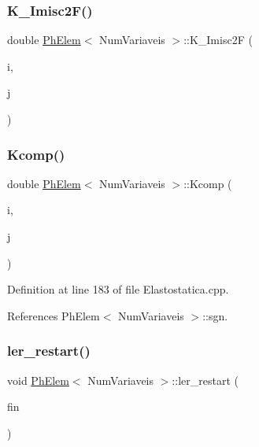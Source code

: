 \subsubsection{\texorpdfstring{K\+\_\+\+Imisc2\+F()}{K\_Imisc2F()}}
{\footnotesize\ttfamily double \hyperlink{classPhElem}{Ph\+Elem}$<$ Num\+Variaveis $>$\+::K\+\_\+\+Imisc2F (\begin{DoxyParamCaption}\item[{const int \&}]{i,  }\item[{const int \&}]{j }\end{DoxyParamCaption})\hspace{0.3cm}{\ttfamily [inherited]}}

\mbox{\label{classPhElem_afdbe06fb407dc4c474b886ed219de195}} 
\subsubsection{\texorpdfstring{Kcomp()}{Kcomp()}}
{\footnotesize\ttfamily double \hyperlink{classPhElem}{Ph\+Elem}$<$ Num\+Variaveis $>$\+::Kcomp (\begin{DoxyParamCaption}\item[{const int \&}]{i,  }\item[{const int \&}]{j }\end{DoxyParamCaption})\hspace{0.3cm}{\ttfamily [inherited]}}



Definition at line 183 of file Elastostatica.\+cpp.



References Ph\+Elem$<$ Num\+Variaveis $>$\+::sgn.

\mbox{\label{classPhElem_a0209eb7e6db7b0b541b51c46269ee9b6}} 
\subsubsection{\texorpdfstring{ler\+\_\+restart()}{ler\_restart()}}
{\footnotesize\ttfamily void \hyperlink{classPhElem}{Ph\+Elem}$<$ Num\+Variaveis $>$\+::ler\+\_\+restart (\begin{DoxyParamCaption}\item[{F\+I\+LE $\ast$}]{fin }\end{DoxyParamCaption})\hspace{0.3cm}{\ttfamily [inherited]}}



